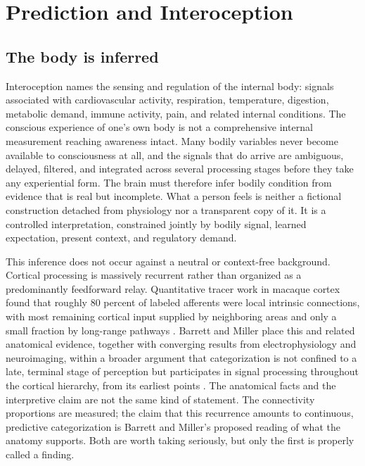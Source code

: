 \documentclass[11pt]{article}
\begin{document}
\section{Prediction and Interoception}\label{sec:prediction}

\subsection{The body is inferred}

Interoception names the sensing and regulation of the internal body: signals associated with cardiovascular activity, respiration, temperature, digestion, metabolic demand, immune activity, pain, and related internal conditions. The conscious experience of one's own body is not a comprehensive internal measurement reaching awareness intact. Many bodily variables never become available to consciousness at all, and the signals that do arrive are ambiguous, delayed, filtered, and integrated across several processing stages before they take any experiential form. The brain must therefore infer bodily condition from evidence that is real but incomplete. What a person feels is neither a fictional construction detached from physiology nor a transparent copy of it. It is a controlled interpretation, constrained jointly by bodily signal, learned expectation, present context, and regulatory demand.

This inference does not occur against a neutral or context-free background. Cortical processing is massively recurrent rather than organized as a predominantly feedforward relay. Quantitative tracer work in macaque cortex found that roughly 80 percent of labeled afferents were local intrinsic connections, with most remaining cortical input supplied by neighboring areas and only a small fraction by long-range pathways \citep{Markov2011}. Barrett and Miller place this and related anatomical evidence, together with converging results from electrophysiology and neuroimaging, within a broader argument that categorization is not confined to a late, terminal stage of perception but participates in signal processing throughout the cortical hierarchy, from its earliest points \citep{BarrettMiller2026}. The anatomical facts and the interpretive claim are not the same kind of statement. The connectivity proportions are measured; the claim that this recurrence amounts to continuous, predictive categorization is Barrett and Miller's proposed reading of what the anatomy supports. Both are worth taking seriously, but only the first is properly called a finding.
\end{document}
